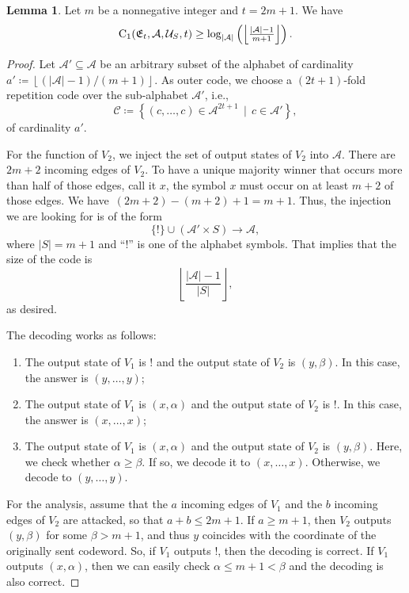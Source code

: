 \documentclass[11pt,a4paper]{article}
\theoremstyle{definition}
\newtheorem{lemma}[theorem]{Lemma}
\newcommand{\mC}{\mathcal{C}}
\newcommand{\mA}{\mathcal{A}}
\newcommand{\mU}{\mathcal{U}}
\newcommand{\CC}{\textnormal{C}}
\begin{document}
\begin{lemma}
\label{lemma1}
Let $m$ be a nonnegative integer and $t=2m+1$. We have $$\CC_1(\mathfrak{E}_t,\mA,\mU_S,t) \ge \log_{|\mA|}\left(\left\lfloor\tfrac{|\mathcal{A}|-1}{m+1}\right\rfloor\right).$$
\end{lemma}
\begin{proof}
Let $\mathcal{A}'\subseteq\mathcal{A}$ be an arbitrary subset of the alphabet of cardinality $a'\coloneqq\left\lfloor(|\mathcal{A}|-1)/(m+1)\right\rfloor$.
As outer code, we choose a $(2t+1)$-fold repetition code over the sub-alphabet $\mathcal{A}'$, i.e., $$\mC\coloneqq\left\{(c,\dots,c)\in\mathcal{A}^{2t+1}\,\mid\,c\in\mathcal{A}'\right\},$$ of cardinality $a'$.


For the function of $V_2$, we inject
the set of output states of $V_2$ into $\mathcal{A}$. There are $2m+2$ incoming edges of $V_2$. To have a unique majority winner that occurs more than half of those edges, call it $x$, the symbol $x$ must occur on at least $m+2$ of those edges. We have~$(2m+2)-(m+2)+1=m+1$. Thus, the injection we are looking for is of the form
$$\{!\} \cup (\mA'\times S) \to \mA,$$
where $|S|=m+1$ and ``!'' is one of the alphabet symbols. That implies that the size of the code is $$\left\lfloor\frac{\lvert \mathcal{A} \rvert-1}{\lvert S \rvert}\right\rfloor,$$ as desired. 

The decoding works as follows:
\begin{enumerate}
    \item The output state of $V_1$ is $!$ and the output state of $V_2$ is $(y,\beta)$. In this case, the answer is $(y,\ldots,y)$;
    \item The output state of $V_1$ is $(x,\alpha)$ and the output state of $V_2$ is $!$. In this case, the answer is $(x,\ldots,x)$;
    \item The output state of $V_1$ is $(x,\alpha)$ and the output state of $V_2$ is $(y,\beta)$. Here, we check whether $\alpha \ge \beta$. If so, we decode it to $(x,\ldots,x)$. Otherwise, we decode to $(y,\ldots,y)$.
\end{enumerate} 
For the analysis, assume that the $a$ incoming edges of $V_1$ and the $b$ incoming edges of $V_2$ are attacked, so that $a+b\le 2m+1$.
If $a\ge m+1$, then $V_2$ outputs $(y,\beta)$ for some $\beta > m+1$, and thus $y$ coincides with the coordinate of the originally sent codeword. So, if $V_1$ outputs $!$, then the decoding is correct. If $V_1$ outputs $(x,\alpha)$, then we can easily check $\alpha\le m+1 <\beta$ and the decoding is also correct.


\end{proof}
\end{document}
